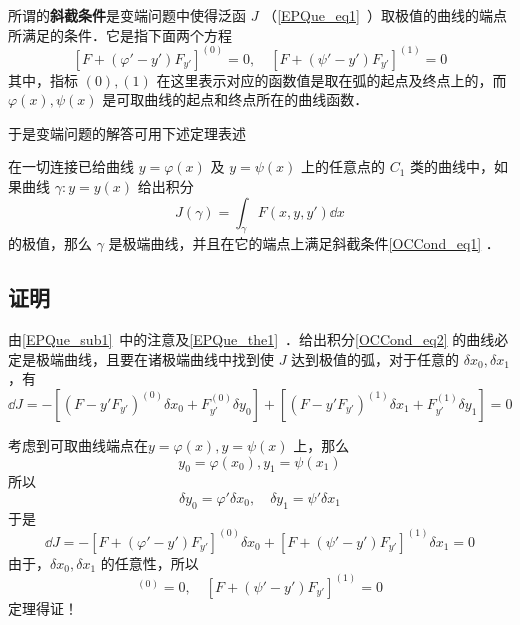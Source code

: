 
所谓的\textbf{斜截条件}是变端问题中使得泛函 $J$ （\autoref{EPQue_eq1}~）取极值的曲线的端点所满足的条件．它是指下面两个方程
\begin{equation}\label{OCCond_eq1}
[F+(\varphi'-y')F_{y'}]^{(0)}=0,\quad [F+(\psi'-y')F_{y'}]^{(1)}=0
\end{equation}
其中，指标 ${(0)},{(1)}$ 在这里表示对应的函数值是取在弧的起点及终点上的，而 $\varphi(x),\psi(x)$ 是可取曲线的起点和终点所在的曲线函数．

于是变端问题的解答可用下述定理表述
\begin{theorem}{}
在一切连接已给曲线 $y=\varphi(x)$ 及 $y=\psi(x)$ 上的任意点的 $C_1$ 类的曲线中，如果曲线 $\gamma:y=y(x)$ 给出积分
\begin{equation}\label{OCCond_eq2}
J(\gamma)=\int_{\gamma}F(x,y,y')\dd x
\end{equation}
的极值，那么 $\gamma$ 是极端曲线，并且在它的端点上满足斜截条件\autoref{OCCond_eq1} ．
\end{theorem}
\subsection{证明}
由\autoref{EPQue_sub1}~中的注意及\autoref{EPQue_the1}~．给出积分\autoref{OCCond_eq2} 的曲线必定是极端曲线，且要在诸极端曲线中找到使 $J$ 达到极值的弧，对于任意的 $\delta x_0,\delta x_1$ ，有
\begin{equation}
\dd J=-[(F-y'F_{y'})^{(0)}\delta {x_0}+ F_{y'}^{(0)}\delta y_0]+[(F-y'F_{y'})^{(1)}\delta {x_1}+F_{y'}^{(1)}\delta y_1]=0
\end{equation}

 考虑到可取曲线端点在$y=\varphi(x),y=\psi(x)$ 上，那么
 \begin{equation}
 y_0=\varphi(x_0),y_1=\psi(x_1)
 \end{equation}
 所以 
 \begin{equation}
 \delta y_0=\varphi'\delta x_0,\quad \delta y_1=\psi'\delta x_1
 \end{equation}
 于是
 \begin{equation}
\dd J=-[F+(\varphi'-y')F_{y'}]^{(0)}\delta {x_0}+[F+(\psi'-y')F_{y'}]^{(1)}\delta {x_1}=0
\end{equation}
由于，$\delta x_0,\delta x_1$ 的任意性，所以
\begin{equation}
[F+(\varphi'-y')F_{y'}]^{(0)}=0,\quad [F+(\psi'-y')F_{y'}]^{(1)}=0
\end{equation}
定理得证！